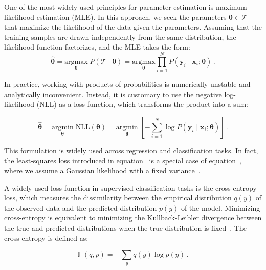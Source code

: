 One of the most widely used principles for parameter estimation is maximum likelihood estimation (MLE). In this approach, we seek the parameters ${\boldsymbol{\theta}} \in \mathcal{T}$ that maximize the likelihood of the data given the parameters. Assuming that the training samples are drawn independently from the same distribution, the likelihood function factorizes, and the MLE takes the form:
\begin{equation}
\label{eq:maximum_likelihood}
    \hat{\boldsymbol{\theta}} = \underset{\boldsymbol{\theta}}{\mathrm{argmax}} \; P\left( \mathcal{T} \mid \boldsymbol{\theta} \right) = \underset{\boldsymbol{\theta}}{\mathrm{argmax}} \prod_{i=1}^N P\left( \mathbf{y}_i \mid \mathbf{x}_i; \boldsymbol{\theta} \right)\,.
\end{equation}

In practice, working with products of probabilities is numerically unstable and analytically inconvenient. Instead, it is customary to use the negative log-likelihood (NLL) as a loss function, which transforms the product into a sum: 

\begin{equation}
\label{eq:neg_log_likelihood}
	\hat{\boldsymbol{{\theta}}} = \underset{\boldsymbol{\theta}}{\mathrm{argmin}} \; \mathrm{NLL}\left( \boldsymbol{\theta} \right) = \underset{\boldsymbol{\theta}}{\mathrm{argmin}} \; \left[ - \sum_{i=1}^N  \log P \left( \mathbf{y}_i  \mid \mathbf{x}_i; \boldsymbol{\theta} \right) \right] \,.
\end{equation}

This formulation is widely used across regression and classification tasks. In fact, the least-squares loss introduced in equation~ is a special case of equation~, where we assume a Gaussian likelihood with a fixed variance~\cite{murphy_probabilistic_2022, zhang_dive_2023}.


A widely used loss function in supervised classification tasks is the cross-entropy loss, which measures the dissimilarity between the empirical distribution $q(y)$ of the observed data and the predicted distribution $p(y)$ of the model. Minimizing cross-entropy is equivalent to minimizing the Kullback-Leibler divergence between the true and predicted distributions when the true distribution is fixed~\cite{prince_understanding_2023}. The cross-entropy is defined as:

\begin{equation}
\label{eq:cross_entropy}
	\mathbb{H}(q,p) = - \sum_y q(y) \log{p(y)} \,.
\end{equation}


